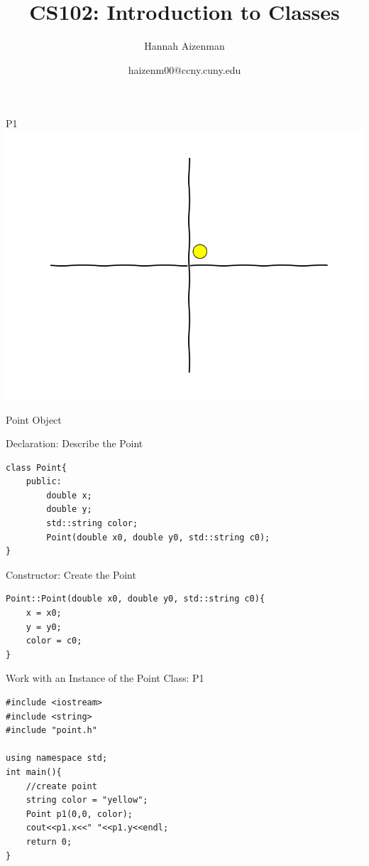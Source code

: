 \documentclass[xcolor={dvipsnames}]{beamer}
\begin{document}
\title{ CS102: Introduction to Classes}
\author{Hannah Aizenman}
\date{haizenm00@ccny.cuny.edu}


\begin{frame}
	\titlepage
\end{frame}

\begin{frame}{P1}
	\includegraphics[width=1\textwidth]{traj000}
\end{frame}

\begin{frame}[fragile]{Point Object}
\begin{block}{Declaration: Describe the Point}
\begin{verbatim}
class Point{
    public:
        double x;
        double y;
        std::string color;
        Point(double x0, double y0, std::string c0);
}
\end{verbatim}
\end{block}
\pause
\begin{block}{Constructor: Create the Point}
\begin{verbatim}
Point::Point(double x0, double y0, std::string c0){
    x = x0;
    y = y0;
    color = c0;
}
\end{verbatim}
\end{block}
\end{frame}

\begin{frame}[fragile]{Work with an Instance of the Point Class: P1}
\begin{verbatim}
#include <iostream>
#include <string>
#include "point.h"

using namespace std;
int main(){
    //create point
    string color = "yellow";
    Point p1(0,0, color);
    cout<<p1.x<<" "<<p1.y<<endl;
    return 0;
}
\end{verbatim}
\end{frame}
\end{document}

